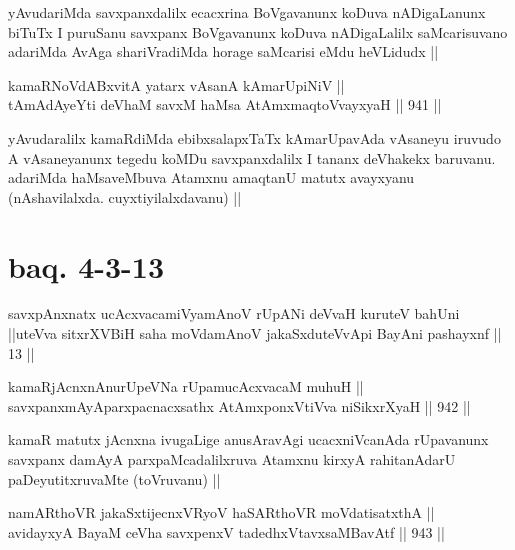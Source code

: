 \begin{artha}
yAvudariMda savxpanxdalilx ecacxrina BoVgavanunx koDuva nADigaLanunx biTuTx I puruSanu savxpanx BoVgavanunx koDuva nADigaLalilx saMcarisuvano adariMda AvAga shariVradiMda horage saMcarisi eMdu heVLidudx ||
\end{artha}

\begin{shl}
kamaRNoVdABxvitA yatarx vAsanA kAmarUpiNiV || \\
tAmAdAyeYti deVhaM savxM haMsa AtAmx\s maqtoV\s vayxyaH ||  941 ||  
\end{shl}

\begin{artha}
yAvudaralilx kamaRdiMda ebibxsalapxTaTx kAmarUpavAda vAsaneyu iruvudo A vAsaneyanunx tegedu koMDu savxpanxdalilx I tananx deVhakekx baruvanu. adariMda haMsaveMbuva Atamxnu amaqtanU matutx avayxyanu (nAshavilalxda. cuyxtiyilalxdavanu) ||
\end{artha}

\section*{baq. 4-3-13}

\begin{shl}
savxpAnxnatx ucAcxvacamiVyamAnoV rUpANi deVvaH kuruteV bahUni ||uteVva sitxrXVBiH saha moVdamAnoV jakaSxduteVvApi BayAni pashayxnf || 13 ||
\end{shl}


\begin{shl}
kamaRjAcnxnAnurUpeVNa rUpamucAcxvacaM muhuH || \\
savxpanxmAyAparxpacnacxsathx AtAmx\s \s ponxVtiVva niSikxrXyaH ||  942 ||  
\end{shl}

\begin{artha}
kamaR matutx jAcnxna ivugaLige anusAravAgi ucacxniVcanAda rUpavanunx savxpanx damAyA parxpaMcadalilxruva Atamxnu kirxyA rahitanAdarU paDeyutitxruvaMte (toVruvanu) ||
\end{artha}


\begin{shl}
namARthoVR jakaSxtijecnxVRyoV haSARthoVR moVdatisatxthA || \\
avidayxyA BayaM ceVha savxpenxV tadedhxVtavxsaMBavAtf ||  943 ||  
\end{shl}

